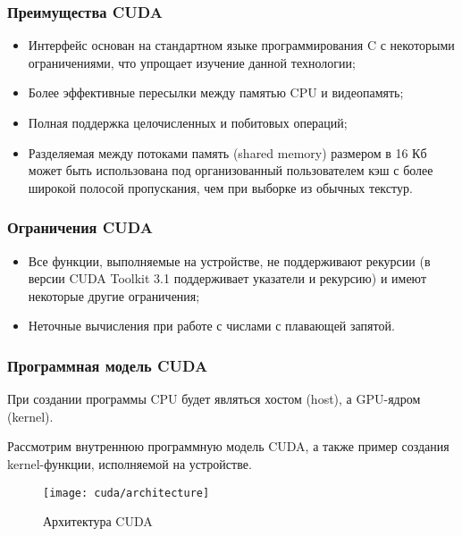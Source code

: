 \subsubsection*{Преимущества CUDA}
\begin{itemize}
    \item Интерфейс основан на стандартном языке программирования C с некоторыми ограничениями, что упрощает изучение данной технологии;
    \item Более эффективные пересылки между памятью CPU и видеопамять;
    \item Полная поддержка целочисленных и побитовых операций;
    \item Разделяемая между потоками память (shared memory) размером в 16 Кб может быть использована под организованный пользователем кэш с более широкой полосой пропускания, чем при выборке из обычных текстур.
\end{itemize}

\subsubsection*{Ограничения CUDA}
\begin{itemize}
    \item Все функции, выполняемые на устройстве, не поддерживают рекурсии (в версии CUDA Toolkit 3.1 поддерживает указатели и рекурсию) и имеют некоторые другие ограничения;
    \item Неточные вычисления при работе с числами с плавающей запятой.
\end{itemize}

\subsubsection*{Программная модель CUDA} 
При создании программы CPU будет являться хостом (host), а GPU-ядром (kernel).

Рассмотрим внутреннюю программную модель CUDA, а также пример создания kernel-функции, исполняемой на устройстве.

\begin{figure}[H]
    \texttt{[image: cuda/architecture]}
    \caption{Архитектура CUDA}
    \label{CUDAArchitecture:image}
\end{figure}


